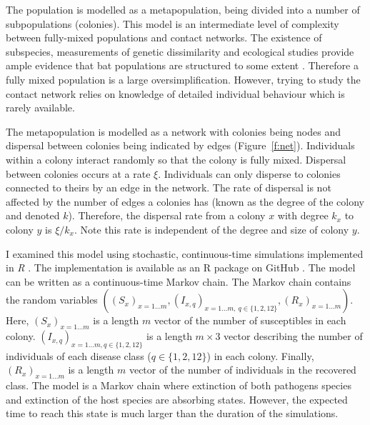 

The population is modelled as a metapopulation, being divided into a number of subpopulations (colonies).
This model is an intermediate level of complexity between fully-mixed populations and contact networks.
The existence of subspecies, measurements of genetic dissimilarity and ecological studies provide ample evidence that bat populations are structured to some extent \cite{kerth2011bats, mccracken1981social, burns2014correlates, wilson2005mammal}.
Therefore a fully mixed population is a large oversimplification.
However, trying to study the contact network relies on knowledge of detailed individual behaviour which is rarely available.		

The metapopulation is modelled as a network with colonies being nodes and dispersal between colonies being indicated by edges (Figure~\ref{f:net}).
Individuals within a colony interact randomly so that the colony is fully mixed.
Dispersal between colonies occurs at a rate $\xi$.
Individuals can only disperse to colonies connected to theirs by an edge in the network.
The rate of dispersal is not affected by the number of edges a colonies has (known as the degree of the colony and denoted $k$).
Therefore, the dispersal rate from a colony $x$ with degree $k_x$ to colony $y$ is $\xi / k_x$.
Note this rate is independent of the degree and size of colony $y$.




I examined this model using stochastic, continuous-time simulations implemented in \emph{R} \cite{R}.
The implementation is available as an R package on GitHub \cite{metapopepi}.
The model can be written as a continuous-time Markov chain.
The Markov chain contains the random variables $((S_x)_{x = 1\ldots m}, (I_{x, q})_{x =1\ldots m,\:q \in \{1, 2, 12\}}, (R_x)_{x = 1\ldots m})$.
Here, $(S_x)_{x = 1\ldots m}$ is a length $m$ vector of the number of susceptibles in each colony.
$(I_{x, q})_{x =1\ldots m, q \in \{1, 2, 12\}}$ is a length $m \times 3$ vector describing the number of individuals of each disease class ($q \in \{1, 2, 12\}$) in each colony.
Finally, $(R_x)_{x = 1\ldots m}$ is a length $m$ vector of the number of individuals in the recovered class.
The model is a Markov chain where extinction of both pathogens species and extinction of the host species are absorbing states.
However, the expected time to reach this state is much larger than the duration of the simulations.

